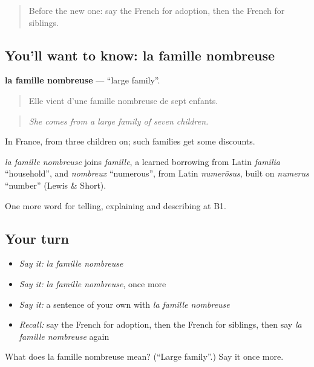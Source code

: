\label{lesson:FR-C492-famille-nombreuse}



\begin{quote}
Before the new one: say the French for adoption, then the French for siblings.
\end{quote}

\subsection*{You'll want to know: la famille nombreuse}
\textbf{la famille nombreuse} — \textquotedblleft{}large family\textquotedblright{}.

\begin{quote}
Elle vient d'une famille nombreuse de sept enfants.
\end{quote}

\begin{quote}
\emph{She comes from a large family of seven children.}
\end{quote}

In France, from three children on; such families get some discounts.

\begin{cousinweb}
\emph{la famille nombreuse} joins \emph{famille}, a learned borrowing from Latin \emph{familia} \textquotedblleft{}household\textquotedblright{}, and \emph{nombreux} \textquotedblleft{}numerous\textquotedblright{}, from Latin \emph{numerōsus}, built on \emph{numerus} \textquotedblleft{}number\textquotedblright{} (Lewis \& Short).
\end{cousinweb}

\begin{grammarlens}[title={What you've built}]
One more word for telling, explaining and describing at B1.
\end{grammarlens}

\subsection*{Your turn}
\begin{itemize}
\raggedright
  \item \emph{Say it:} \emph{la famille nombreuse}
  \item \emph{Say it:} \emph{la famille nombreuse}, once more
  \item \emph{Say it:} a sentence of your own with \emph{la famille nombreuse}
  \item \emph{Recall:} say the French for adoption, then the French for siblings, then say \emph{la famille nombreuse} again
\end{itemize}

\begin{tcolorbox}[breakable,colback=teal!4,colframe=teal!35!black,title={Before you move on}]
What does la famille nombreuse mean? (\textquotedblleft{}Large family\textquotedblright{}.) Say it once more.
\end{tcolorbox}
